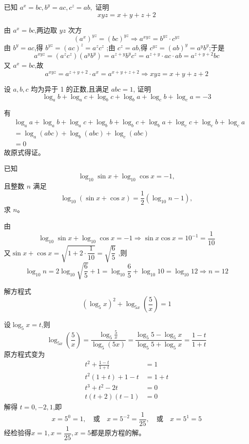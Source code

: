 \begin{questions}
    \question 已知 $a^x = bc,b^y = ac,c^z = ab,$ 证明 $$xyz = x + y + z + 2$$

    \begin{solution}
        由 $a^x = bc$,两边取 $yz$ 次方
        \[
        (a^x)^{yz} = (bc)^{yz} \Rightarrow a^{xyz} = b^{yz} \cdot c^{yz}
        \]
        由 $b^y = ac$,得 $b^{yz} = (ac)^z = a^z c^z$ ;由 $c^z = ab$,得 $c^{yz} = (ab)^y = a^y b^y$;于是        
        \[
        a^{xyz} = (a^z c^z)(a^y b^y) = a^{z+y} b^y c^z = a^{z+y} \cdot ac \cdot ab = a^{z+y+2} bc
        \]
        又 $a^x = bc$,故
        \[
        a^{xyz} = a^{z+y+2} \cdot a^x = a^{x+y+z+2} \Rightarrow xyz = x + y + z + 2
        \]
    \end{solution}

    \question 设 \(a, b, c\) 均为异于 1 的正数,且满足 \(abc = 1\), 证明
    \[
    \log_a b + \log_a c + \log_b c + \log_b a + \log_c b + \log_c a = -3
    \]
    \begin{solution}
    有\begin{align*}
          &\log_a a+\log_a b + \log_a c + \log_b b+ \log_b c + \log_b a + \log_c c + \log_c b + \log_c a \\ &=\log_a (abc)+\log_b (abc)+\log_c (abc)\\&=0
      \end{align*}
      故原式得证。
    \end{solution}

    \question 已知
        \[
        \log_{10} \sin x + \log_{10} \cos x = -1,
        \]
        且整数 $n$ 满足
        \[
        \log_{10} (\sin x + \cos x) = \frac{1}{2} (\log_{10} n - 1),
        \]
        求 \( n\)。
    \begin{solution}
        由
        \[
        \log_{10} \sin x + \log_{10} \cos x = -1
        \Rightarrow \sin x \cos x = 10^{-1}= \frac{1}{10}
        \]
        又$\sin x + \cos x=\sqrt{1+2\cdot\dfrac{1}{10}}=\sqrt{\dfrac{6}{5}}$ ,则
        \[
        \log_{10}{n} = 2 \log_{10}{\sqrt{\frac{6}{5}}} + 1 = \log_{10}{\frac{6}{5}} + \log_{10}{10} = \log_{10}{12} \Rightarrow n=12
        \]
    \end{solution}

    \question 解方程式 
    \[
    (\log_{5}x)^{2} + \log_{5x}\left(\frac{5}{x}\right) = 1
    \]
    \begin{solution}
        设$\log_5 x = t$,则
        \[
        \log_{5x}\left(\frac{5}{x}\right) = \frac{\log_5\frac{5}{x}}{\log_5(5x)} = \frac{\log_5 5 - \log_5 x}{\log_5 5 + \log_5 x} = \frac{1-t}{1+t}
        \]
        原方程式变为
        \begin{align*}
        t^2 + \frac{1-t}{1+t} &= 1 \\
        t^2(1+t) + 1-t &= 1+t \\
        t^3 + t^2 - 2t &= 0 \\
        t(t+2)(t-1) &= 0
        \end{align*}
        解得 $t = 0, -2, 1$,即 
        \[
        x = 5^0 = 1, \quad \text{或} \quad x = 5^{-2} = \frac{1}{25}, \quad \text{或} \quad x = 5^1 = 5
        \]
        经检验得$x = 1, x = \dfrac{1}{25}, x=5$都是原方程的解。
    \end{solution}
    

\end{questions}
